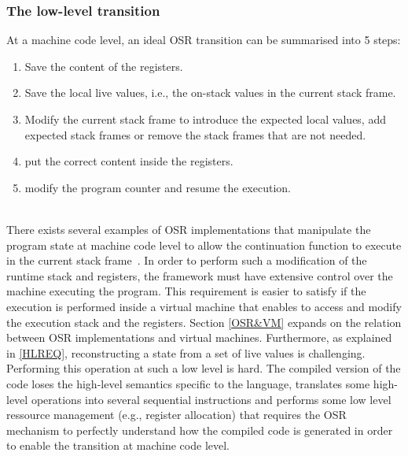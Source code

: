 \subsubsection{The low-level transition}
At a machine code level, an ideal OSR transition can be summarised into 5 steps: 
\begin{enumerate}
    \item Save the content of the registers.
    \item Save the local live values, i.e., the on-stack values in the current stack frame.
    \item Modify the current stack frame to introduce the expected local values, add expected stack frames or remove the stack frames that are not needed.
    \item put the correct content inside the registers.
    \item modify the program counter and resume the execution.
\end{enumerate}\\

There exists several examples of OSR implementations that manipulate the program state at machine code level to allow the continuation function to execute in the current stack frame~\cite{chambers1991making, holzle1992debugging, suganuma2006region}.
In order to perform such a modification of the runtime stack and registers, the framework must have extensive control over the machine executing the program.
This requirement is easier to satisfy if the execution is performed inside a virtual machine that enables to access and modify the execution stack and the registers.
Section \ref{OSR&VM} expands on the relation between OSR implementations and virtual machines.
Furthermore, as explained in \ref{HLREQ}, reconstructing a state from a set of live values is challenging. 
Performing this operation at such a low level is hard.
The compiled version of the code loses the high-level semantics specific to the language, translates some high-level operations into several sequential instructions and performs some low level ressource management (e.g., register allocation) that requires the OSR mechanism to perfectly understand how the compiled code is generated in order to enable the transition at machine code level.\\

